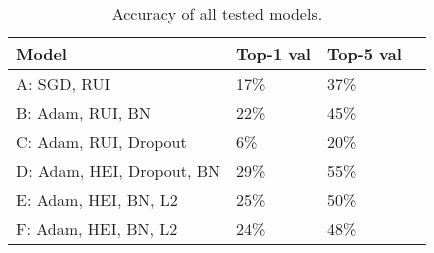 

\begin{table}[htbp]
\begin{center}
\begin{tabular}{|l|l|l|l|}
\hline
\textbf{Model} & \textbf{Top-1 val} & \textbf{Top-5 val}  \\
\hline
          A: SGD, RUI                &   17\%  		  &  37\% \\
          B: Adam, RUI, BN           &   22\%  		  &  45\% \\
          C: Adam, RUI, Dropout      &   6\%      	&  20\% \\
          D: Adam, HEI, Dropout, BN  &   29\%  	    &  55\% \\
          E: Adam, HEI, BN, L2       &   25\%       &  50\% \\
          F: Adam, HEI, BN, L2       &   24\%       &  48\% \\

\hline
\end{tabular}
\caption[]
{\small
Accuracy of all tested models.
}
\label{table:accuracy}
\end{center}
\end{table}
